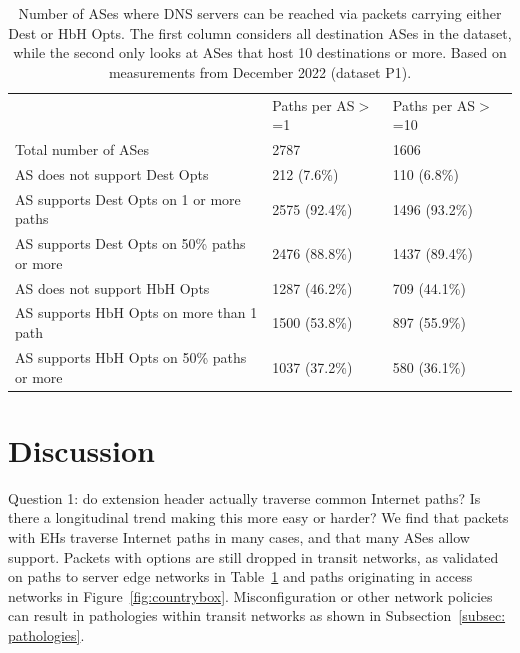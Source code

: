\documentclass[conference]{IEEEtran}
\begin{document}
    \begin{table}[]
\begin{tabular}{p{}|p{}p{}}
                                          & Paths per AS$>$=1 & Paths per AS$>$=10 \\ \cline{1-3} 
Total number of ASes                      & 2787                                            & 1606                                            \\ \hline
AS does not support Dest Opts               & 212 (7.6\%)                                     & 110 (6.8\%)                                     \\
AS supports Dest Opts on 1 or more paths   & 2575 (92.4\%)                                   & 1496 (93.2\%)                                   \\
AS supports Dest Opts on 50\% paths or more & 2476  (88.8\%)                                  & 1437 (89.4\%)                                   \\ \hline
AS does not support HbH Opts               & 1287 (46.2\%)                                   & 709 (44.1\%)                                    \\
AS supports HbH Opts on more than 1 path   & 1500 (53.8\%)                                   & 897 (55.9\%)                                    \\
AS supports HbH Opts on 50\% paths or more & 1037 (37.2\%)                                   & 580 (36.1\%)                                   
\end{tabular}
\label{tbl:as_pathspider}
\caption{Number of ASes where DNS servers can be reached via packets carrying either Dest or HbH Opts. The first column considers all destination ASes in the dataset, while the second only looks at ASes that host 10 destinations or more. Based on measurements from December 2022 (dataset P1).}
\end{table}

\section{Discussion} 
\label{sec:discussion}

Question 1: do extension header actually traverse common Internet paths? Is there a longitudinal trend making this more easy or harder?
We find that packets with EHs traverse Internet paths in many cases, and that many ASes allow support.
Packets with options are still dropped in transit networks, as validated on paths to server edge networks in Table~\ref{tbl:as_pathspider} and paths originating in access networks in Figure~\ref{fig:countrybox}. Misconfiguration or other network policies can result in pathologies within transit networks as shown in Subsection~\ref{subsec: pathologies}.
\end{document}
